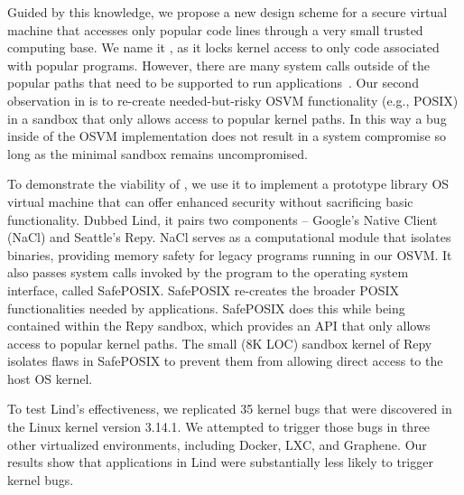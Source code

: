 Guided by this knowledge, we propose a new design scheme for a secure virtual machine that
accesses only popular code lines through a very small trusted computing base.
We name it \lip, as it locks kernel access to only code
associated with popular programs. %
However, there are many system calls outside of the popular paths that need to
be supported to run applications~\cite{tsai2016study}.  Our second
observation in \lip is to re-create needed-but-risky OSVM functionality
(e.g., POSIX) in a sandbox that only allows access to popular kernel paths.
In this way a bug inside of the OSVM implementation does not result in a system compromise
so long as the minimal sandbox remains uncompromised.


To demonstrate the viability of \lip, we use it to implement a
prototype library OS virtual machine that can offer enhanced security without sacrificing
basic functionality. Dubbed Lind, it pairs two components -- Google's Native Client
(NaCl) and Seattle's Repy. 
NaCl serves as a computational module that isolates 
binaries, providing memory safety for legacy programs running in our OSVM.
It also passes system calls invoked by the program to the operating system interface, called SafePOSIX.
SafePOSIX re-creates the broader POSIX functionalities needed by applications.
SafePOSIX does this while being contained within the Repy sandbox, which
provides an API that only allows access to popular kernel paths.
The small (8K LOC) sandbox kernel of Repy isolates flaws in SafePOSIX
to prevent them from allowing direct access to the host OS kernel.

To test Lind's effectiveness, we replicated 35 kernel bugs that were
discovered in the Linux kernel version 3.14.1.  We attempted to trigger those
bugs in three other virtualized environments,
including Docker, LXC, and Graphene.
Our results show that applications in Lind were substantially less likely to trigger
kernel bugs.

